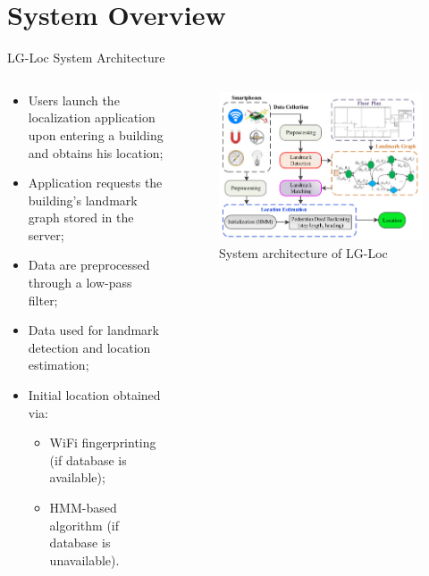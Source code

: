 \section{System Overview}

\begin{frame}{LG-Loc System Architecture}
    \begin{columns}
        \begin{column}{.6\textwidth}
            \begin{itemize}
                \item Users launch the localization application upon entering a building and obtains his location;
                \item Application requests the building's landmark graph stored in the server;
                \item Data are preprocessed through a low-pass filter;
                \item Data used for landmark detection and location estimation;
                \item Initial location obtained via:
                    \begin{itemize}
                        \item WiFi fingerprinting (if database is available);
                        \item HMM-based algorithm (if database is unavailable).
                    \end{itemize}
            \end{itemize}
        \end{column}
        \begin{column}{.4\textwidth}
            \begin{figure}[t]
                \centering
                \includegraphics[width=\linewidth]{images/sys.jpg}
                \caption{System architecture of LG-Loc}
                \label{fig:sys}
            \end{figure}
        \end{column}
    \end{columns}
\end{frame}